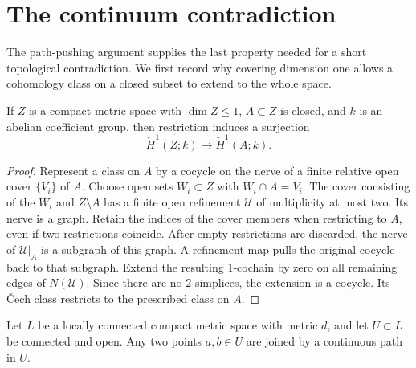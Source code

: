 \section{The continuum contradiction}
\label{sec:conclusion}

The path-pushing argument supplies the last property needed for a short
topological contradiction.  We first record why covering dimension one
allows a cohomology class on a closed subset to extend to the whole
space.

\begin{lemma}\label{end:restriction}
If $Z$ is a compact metric space with $\dim Z\le1$, $A\subset Z$ is
closed, and $k$ is an abelian coefficient group, then restriction induces
a surjection
\[
 \check H^1(Z;k)\longrightarrow\check H^1(A;k).
\]
\end{lemma}

\begin{proof}
Represent a class on $A$ by a cocycle on the nerve of a finite relative
open cover $\{V_i\}$ of $A$.  Choose open sets $W_i\subset Z$ with
$W_i\cap A=V_i$.  The cover consisting of the $W_i$ and $Z\setminus A$
has a finite open refinement $\mathcal U$ of multiplicity at most two.
Its nerve is a graph.  Retain the indices of the cover members when
restricting to $A$, even if two restrictions coincide. After empty
restrictions are discarded, the nerve of $\mathcal U|_A$ is a subgraph
of this graph. A refinement map pulls
the original cocycle back to that subgraph.  Extend the resulting
$1$-cochain by zero on all remaining edges of $N(\mathcal U)$.  Since
there are no $2$-simplices, the extension is a cocycle.  Its \v{C}ech
class restricts to the prescribed class on $A$.
\end{proof}

\begin{lemma}\label{end:paths-in-regions}
Let $L$ be a locally connected compact metric space with metric $d$, and let $U\subset L$
be connected and open. Any two points $a,b\in U$ are joined by a
continuous path in $U$.
\end{lemma}

